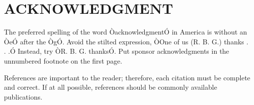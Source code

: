 \documentclass[a4paper, 10pt, conference]{IEEEtran}
\begin{document}
\section{ACKNOWLEDGMENT}

The preferred spelling of the word ÒacknowledgmentÓ in America is without an ÒeÓ after the ÒgÓ. Avoid the stilted expression, ÒOne of us (R. B. G.) thanks . . .Ó  Instead, try ÒR. B. G. thanksÓ. Put sponsor acknowledgments in the unnumbered footnote on the first page.




References are important to the reader; therefore, each citation must be complete and correct. If at all possible, references should be commonly available publications.






\end{document}
